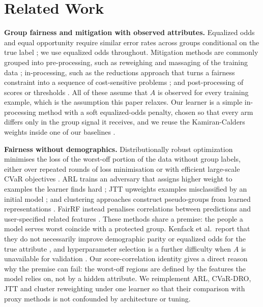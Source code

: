 \documentclass[conference]{IEEEtran}
\begin{document}
\section{Related Work}
\textbf{Group fairness and mitigation with observed attributes.} Equalized odds and equal opportunity require similar error rates across groups conditional on the true label \cite{hardt2016equality}; we use equalized odds throughout. Mitigation methods are commonly grouped into pre-processing, such as reweighing and massaging of the training data \cite{kamiran2012data}; in-processing, such as the reductions approach that turns a fairness constraint into a sequence of cost-sensitive problems \cite{agarwal2018reductions}; and post-processing of scores or thresholds \cite{hardt2016equality}. All of these assume that $A$ is observed for every training example, which is the assumption this paper relaxes. Our learner is a simple in-processing method with a soft equalized-odds penalty, chosen so that every arm differs only in the group signal it receives, and we reuse the Kamiran-Calders weights inside one of our baselines \cite{kamiran2012data}.

\textbf{Fairness without demographics.} Distributionally robust optimization minimises the loss of the worst-off portion of the data without group labels, either over repeated rounds of loss minimisation \cite{hashimoto2018fairness} or with efficient large-scale CVaR objectives \cite{levy2020large}. ARL trains an adversary that assigns higher weight to examples the learner finds hard \cite{lahoti2020fairness}; JTT upweights examples misclassified by an initial model \cite{liu2021just}; and clustering approaches construct pseudo-groups from learned representations \cite{sohoni2020no}. FairRF instead penalises correlations between predictions and user-specified related features \cite{zhao2022towards}. These methods share a premise: the people a model serves worst coincide with a protected group. Kenfack et al.\ report that they do not necessarily improve demographic parity or equalized odds for the true attribute \cite{kenfack2024fairness}, and hyperparameter selection is a further difficulty when $A$ is unavailable for validation \cite{veldanda2023hyper}. Our score-correlation identity gives a direct reason why the premise can fail: the worst-off regions are defined by the features the model relies on, not by a hidden attribute. We reimplement ARL, CVaR-DRO, JTT and cluster reweighting under one learner so that their comparison with proxy methods is not confounded by architecture or tuning.
\end{document}
